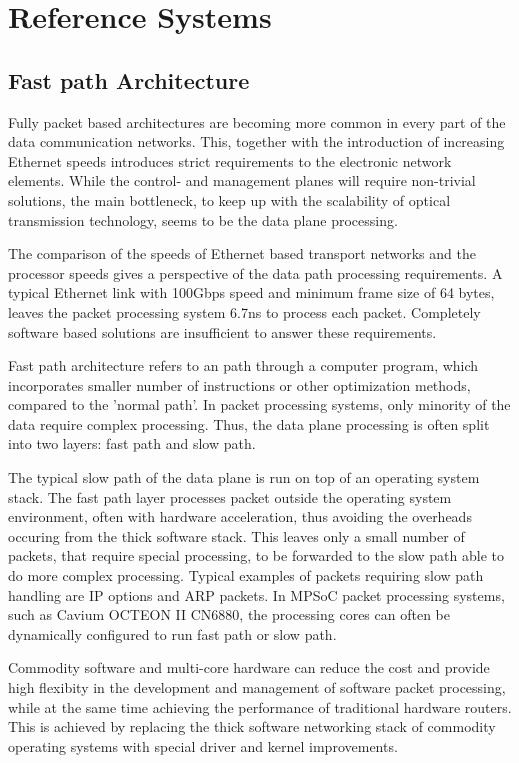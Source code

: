 \chapter{Reference Systems}
\label{chapter:reference-systems}

\section{Fast path Architecture}
Fully packet based architectures are becoming more common in every part of the data communication networks. This, together with the introduction of increasing Ethernet speeds introduces strict requirements to the electronic network elements. While the control- and management planes will require non-trivial solutions, the main bottleneck, to keep up with the scalability of optical transmission technology, seems to be the data plane processing.~\cite{Hauger:2009:PP}

The comparison of the speeds of Ethernet based transport networks and the processor speeds gives a perspective of the data path processing requirements. A typical Ethernet link with 100Gbps speed and minimum frame size of 64 bytes, leaves the packet processing system 6.7ns to process each packet. Completely software based solutions are insufficient to answer these requirements.~\cite{Hauger:2009:PP}

Fast path architecture refers to an path through a computer program, which incorporates smaller number of instructions or other optimization methods, compared to the 'normal path'. In packet processing systems, only minority of the data require complex processing. Thus, the data plane processing is often split into two layers: fast path and slow path.~\cite{cavium:2010:fundamentals, 6wind:2016:FP}

The typical slow path of the data plane is run on top of an operating system stack. The fast path layer processes packet outside the operating system environment, often with hardware acceleration, thus avoiding the overheads occuring from the thick software stack. This leaves only a small number of packets, that require special processing, to be forwarded to the slow path able to do more complex processing. Typical examples of packets requiring slow path handling are IP options and ARP packets. In MPSoC packet processing systems, such as Cavium OCTEON II CN6880, the processing cores can often be dynamically configured to run fast path or slow path.~\cite{cavium:2010:fundamentals, 6wind:2016:FP}

Commodity software and multi-core hardware can reduce the cost and provide high flexibity in the development and management of software packet processing, while at the same time achieving the performance of traditional hardware routers. This is achieved by replacing the thick software networking stack of commodity operating systems with special driver and kernel improvements.

